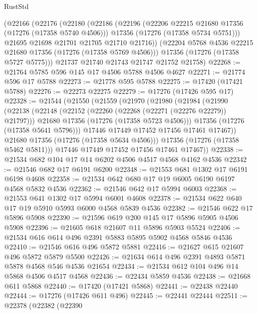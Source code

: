 \begin{lexlean}{RustStd}
\begin{coremodule}
    (@22166
      (@22176
        (@22180
          (@22186
            (@22196
              (@22206 @22215 @21680 @17356 (@17276 (@17358 @5740 @4506)))
              @17356
              (@17276 (@17358 @5734 @5751)))
            @21695
            @21698
            @21701
            @21705
            @21710
            @21716))
        (@22204 @5768 @4536 @22215 @21680 @17356 (@17276 (@17358 @5769 @4506)))
        @17356
        (@17276 (@17358 @5727 @5775)))
      @21737
      @21740
      @21743
      @21747
      @21752
      @21758)
@22268 := @21764 @5785 @596 @145 @17 @4506 @5788 @4506 @4627
@22271 := @21774 @596 @17 @5788
@22273 := @21778 @595 @5788
@22275 := @17420 (@17421 @5788)
@22276 := @22273 @22275
@22279 := @17276 (@17426 @595 @17)
@22328 := @21544
    (@21550
      (@21559
        (@21970
          (@21980
            (@21984
              (@21990
                (@22138
                  (@22148
                    (@22152 (@22260 (@22268 (@22271 (@22276 @22279)) @21797)))
                    @21680
                    @17356
                    (@17276 (@17358 @5723 @4506)))
                  @17356
                  (@17276 (@17358 @5641 @5796)))
                @17446
                @17449
                @17452
                @17456
                @17461
                @17467))
            @21680
            @17356
            (@17276 (@17358 @5634 @4506)))
          @17356
          (@17276 (@17358 @5462 @5811)))
        @17446
        @17449
        @17452
        @17456
        @17461
        @17467))
@22338 := @21534 @682 @104 @17 @14 @6202 @4506 @4517 @4568 @4162 @4536
@22342 := @21546 @682 @17 @6191 @6200
@22348 := @21553 @681 @1302 @17 @6191 @6198 @4608
@22358 := @21534 @642 @680 @17 @19 @6005 @6190 @6197 @4568 @5832 @4536
@22362 := @21546 @642 @17 @5994 @6003
@22368 := @21553 @641 @1302 @17 @5994 @6001 @4608
@22378 := @21534 @622 @640 @17 @19 @5910 @5993 @6000 @4568 @5839 @4536
@22382 := @21546 @622 @17 @5896 @5908
@22390 := @21596 @619 @200 @145 @17 @5896 @5905 @4506 @5908
@22396 := @21605 @618 @21607 @11 @5896 @5903 @5524
@22406 := @21534 @616 @614 @496 @2391 @5883 @5895 @5902 @4568 @5846 @4536
@22410 := @21546 @616 @496 @5872 @5881
@22416 := @21627 @615 @21607 @496 @5872 @5879 @5500
@22426 := @21634 @614 @496 @2391 @4893 @5871 @5878 @4568 @546 @4536 @21654
@22434 := @21534 @612 @104 @496 @14 @5868 @4506 @4517 @4568
@22436 := @22434 @5859 @4536
@22438 := @21668 @611 @5868
@22440 := @17420 (@17421 @5868)
@22441 := @22438 @22440
@22444 := @17276 (@17426 @611 @496)
@22445 := @22441 @22444
@22511 := @22378
    (@22382
      (@22390

\end{coremodule}
\end{lexlean}
